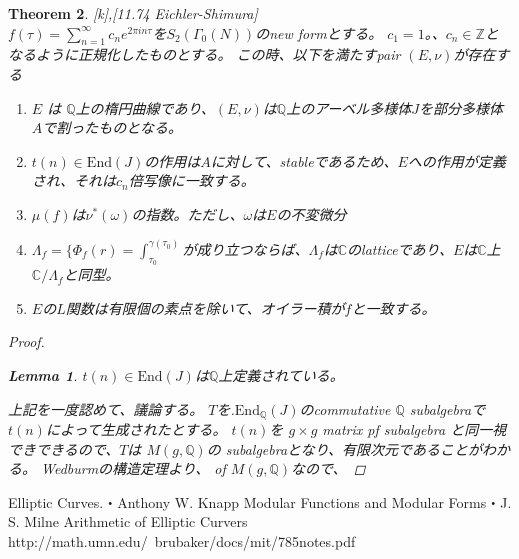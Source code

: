 \documentclass{ujarticle}
\newtheorem{thm}{Theorem}[section]
\newtheorem{lem}[thm]{Lemma}
\begin{document}
\begin{thm}{[k],[11.74 Eichler-Shimura]} \\
  $f(\tau)=\sum_{n=1}^{\infty}c_ne^{2 \pi i n \tau}$を$S_2(\Gamma_0(N))$のnew formとする。
  $c_1=1$。、$c_n \in \mathbb{Z}$となるように正規化したものとする。
  この時、以下を満たすpair $(E, \nu)$が存在する
  \begin{enumerate}
    \item $E$ は $\mathbb{Q}$上の楕円曲線であり、$(E, \nu)$は$\mathbb{Q}$上のアーベル多様体$J$を部分多様体$A$で割ったものとなる。
    \item $t(n) \in  \mathrm{End}(J)$の作用は$A$に対して、stableであるため、$E$への作用が定義され、それは$c_n$倍写像に一致する。
    \item $\mu(f)$は$\nu^*( \omega)$の指数。ただし、$ \omega$は$E$の不変微分
    \item $\Lambda_f  = \{ \Phi_f(r) = \int_{\tau_0}^{\gamma(\tau_0)}$が成り立つならば、$\Lambda_f$は$\mathbb{C}$のlatticeであり、$E$は$\mathbb{C}$上$\mathbb{C}/\Lambda_f$と同型。
    \item $E$の$L$関数は有限個の素点を除いて、オイラー積が$f$と一致する。
  \end{enumerate}

\begin{proof}
\begin{lem}
$t(n) \in \mathrm{End}(J)$は$\mathbb{Q}$上定義されている。
\end{lem}
上記を一度認めて、議論する。
$T$を.$\mathrm{End}_{\mathbb{Q}}(J)$のcommutative $\mathbb{Q}$ subalgebraで$t(n)$によって生成されたとする。
$t(n)$を $g \times g$ matrix pf subalgebra
と同一視できできるので、$T$は $M(g,\mathbb{Q})$の subalgebraとなり、有限次元であることがわかる。
Wedburmの構造定理より、
of $M(g,\mathbb{Q})$なので、
\end{proof}










\end{thm}


\begin{thebibliography}{数字}
   Elliptic Curves.・Anthony W. Knapp
   Modular Functions and Modular Forms・J. S. Milne
   Arithmetic of Elliptic Curvers
   http://math.umn.edu/~brubaker/docs/mit/785notes.pdf
\end{thebibliography}
\end{document}
